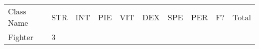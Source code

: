 \documentclass[12pt]{article}
\begin{document}
\begin{longtable}[]{@{}llllllllll@{}}
\toprule
\begin{minipage}[t]{0.13\columnwidth}\raggedright\strut
Class Name
\strut\end{minipage} &
\begin{minipage}[t]{0.06\columnwidth}\raggedright\strut
STR
\strut\end{minipage} &
\begin{minipage}[t]{0.06\columnwidth}\raggedright\strut
INT
\strut\end{minipage} &
\begin{minipage}[t]{0.06\columnwidth}\raggedright\strut
PIE
\strut\end{minipage} &
\begin{minipage}[t]{0.06\columnwidth}\raggedright\strut
VIT
\strut\end{minipage} &
\begin{minipage}[t]{0.06\columnwidth}\raggedright\strut
DEX
\strut\end{minipage} &
\begin{minipage}[t]{0.06\columnwidth}\raggedright\strut
SPE
\strut\end{minipage} &
\begin{minipage}[t]{0.06\columnwidth}\raggedright\strut
PER
\strut\end{minipage} &
\begin{minipage}[t]{0.07\columnwidth}\raggedright\strut
F?
\strut\end{minipage} &
\begin{minipage}[t]{0.08\columnwidth}\raggedright\strut
Total
\strut\end{minipage}\tabularnewline
\begin{minipage}[t]{0.13\columnwidth}\raggedright\strut
Fighter
\strut\end{minipage} &
\begin{minipage}[t]{0.06\columnwidth}\raggedright\strut
3
\strut\end{minipage} &
\begin{minipage}[t]{0.06\columnwidth}\raggedright\strut
\strut\end{minipage} &
\begin{minipage}[t]{0.06\columnwidth}\raggedright\strut
\strut\end{minipage} &
\begin{minipage}[t]{0.06\columnwidth}\raggedright\strut
\strut\end{minipage} &
\begin{minipage}[t]{0.06\columnwidth}\raggedright\strut

\end{minipage}
\end{longtable}
\end{document}
